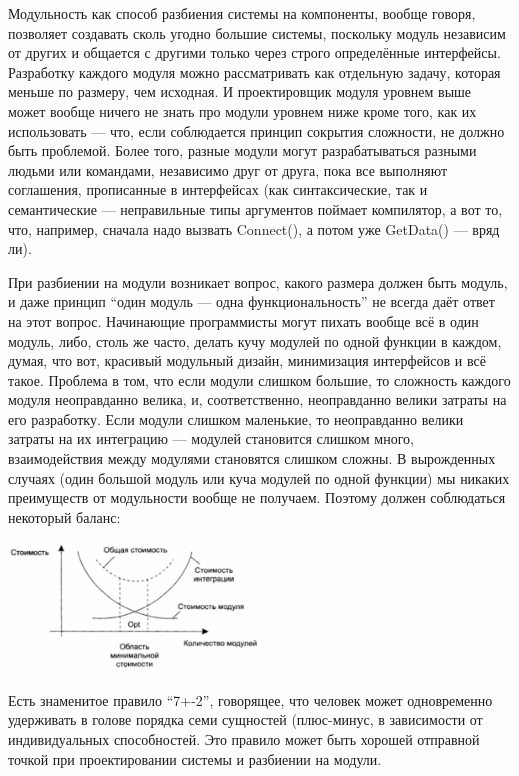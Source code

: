 \documentclass[a5paper]{article}
\begin{document}
Модульность как способ разбиения системы на компоненты, вообще говоря, позволяет создавать сколь угодно большие системы, поскольку модуль независим от других и общается с другими только через строго определённые интерфейсы. Разработку каждого модуля можно рассматривать как отдельную задачу, которая меньше по размеру, чем исходная. И проектировщик модуля уровнем выше может вообще ничего не знать про модули уровнем ниже кроме того, как их использовать --- что, если соблюдается принцип сокрытия сложности, не должно быть проблемой. Более того, разные модули могут разрабатываться разными людьми или командами, независимо друг от друга, пока все выполняют соглашения, прописанные в интерфейсах (как синтаксические, так и семантические --- неправильные типы аргументов поймает компилятор, а вот то, что, например, сначала надо вызвать Connect(), а потом уже GetData() --- вряд ли).

При разбиении на модули возникает вопрос, какого размера должен быть модуль, и даже принцип ``один модуль --- одна функциональность'' не всегда даёт ответ на этот вопрос. Начинающие программисты могут пихать вообще всё в один модуль, либо, столь же часто, делать кучу модулей по одной функции в каждом, думая, что вот, красивый модульный дизайн, минимизация интерфейсов и всё такое. Проблема в том, что если модули слишком большие, то сложность каждого модуля неоправданно велика, и, соответственно, неоправданно велики затраты на его разработку. Если модули слишком маленькие, то неоправданно велики затраты на их интеграцию --- модулей становится слишком много, взаимодействия между модулями становятся слишком сложны. В вырожденных случаях (один большой модуль или куча модулей по одной функции) мы никаких преимуществ от модульности вообще не получаем. Поэтому должен соблюдаться некоторый баланс:

\begin{center}
	\includegraphics[width=0.5\textwidth]{modulesCost.png}
\end{center}

Есть знаменитое правило ``7+-2'', говорящее, что человек может одновременно удерживать в голове порядка семи сущностей (плюс-минус, в зависимости от индивидуальных способностей. Это правило может быть хорошей отправной точкой при проектировании системы и разбиении на модули.
\end{document}
